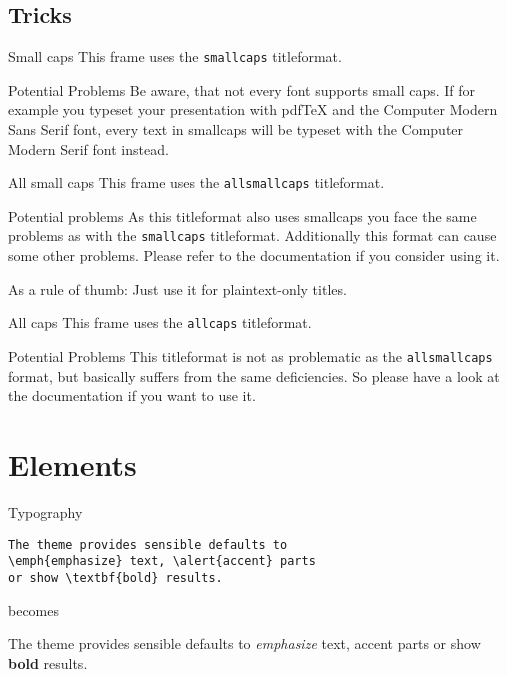 \documentclass[10pt]{beamer}
\begin{document}
\subsection{Tricks}

{
\begin{frame}{Small caps}
	This frame uses the \texttt{smallcaps} titleformat.

	\begin{alertblock}{Potential Problems}
		Be aware, that not every font supports small caps. If for example you typeset your presentation with pdfTeX and the Computer Modern Sans Serif font, every text in smallcaps will be typeset with the Computer Modern Serif font instead.
	\end{alertblock}
\end{frame}
}

{
\begin{frame}{All small caps}
	This frame uses the \texttt{allsmallcaps} titleformat.

	\begin{alertblock}{Potential problems}
		As this titleformat also uses smallcaps you face the same problems as with the \texttt{smallcaps} titleformat. Additionally this format can cause some other problems. Please refer to the documentation if you consider using it.

		As a rule of thumb: Just use it for plaintext-only titles.
	\end{alertblock}
\end{frame}
}

{
\begin{frame}{All caps}
	This frame uses the \texttt{allcaps} titleformat.

	\begin{alertblock}{Potential Problems}
		This titleformat is not as problematic as the \texttt{allsmallcaps} format, but basically suffers from the same deficiencies. So please have a look at the documentation if you want to use it.
	\end{alertblock}
\end{frame}
}

\section{Elements}

\begin{frame}[fragile]{Typography}
      \begin{verbatim}The theme provides sensible defaults to
\emph{emphasize} text, \alert{accent} parts
or show \textbf{bold} results.\end{verbatim}

  \begin{center}becomes\end{center}

  The theme provides sensible defaults to \emph{emphasize} text,
  \alert{accent} parts or show \textbf{bold} results.
\end{frame}
\end{document}
